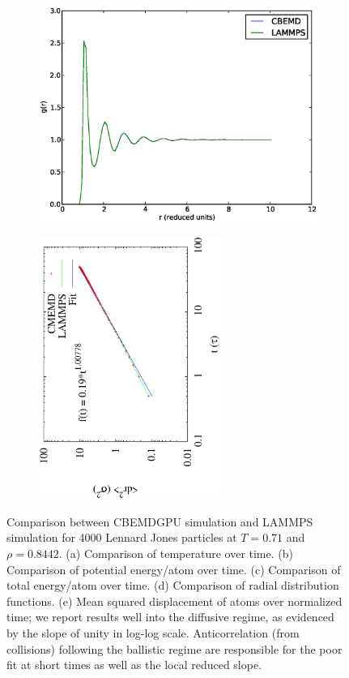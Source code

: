 \documentclass[12pt]{article}
\begin{document}
\begin{figure}[H]
\begin{subfigure}{0.5\textwidth}
	\caption{}
	\end{subfigure}
	\begin{subfigure}{0.5\textwidth}
	\includegraphics[width=\textwidth]{gr_compare}
	\caption{}
	\end{subfigure}
	\begin{subfigure}{0.5\textwidth}
	\includegraphics[width=0.65\textwidth, angle=-90]{msd.eps}
	\caption{}
	\end{subfigure}
	\caption{Comparison between CBEMDGPU simulation and LAMMPS simulation for 4000 Lennard Jones particles at $T=0.71$ and $\rho=0.8442$. (a) Comparison of temperature over time. (b) Comparison of potential energy/atom over time. (c) Comparison of total energy/atom over time. (d) Comparison of radial distribution functions. (e) Mean squared displacement of atoms over normalized time; we report results well into the diffusive regime, as evidenced by the slope of unity in log-log scale.  Anticorrelation (from collisions) following the ballistic regime are responsible for the poor fit at short times as well as the local reduced slope.}
	\label{fig:lmp_compare}
\end{figure}
\end{document}
